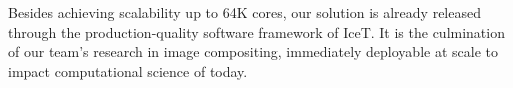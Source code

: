 \documentclass{sig-alternate}
\newcommand*{\lcite}[1]{~\cite{#1}}
\begin{document}
Besides achieving scalability up to 64K cores, our solution is already released 
through the production-quality software framework of IceT.
It is the culmination of our team's research in image compositing, 
immediately deployable at scale to impact computational science of today.

\end{document}
